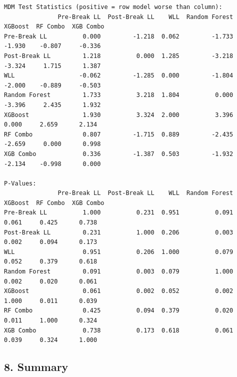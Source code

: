 \documentclass[
  letterpaper,
  DIV=11,
  numbers=noendperiod]{scrartcl}
\begin{document}
\begin{verbatim}
MDM Test Statistics (positive = row model worse than column):
               Pre-Break LL  Post-Break LL    WLL  Random Forest  XGBoost  RF Combo  XGB Combo
Pre-Break LL          0.000         -1.218  0.062         -1.733   -1.930    -0.807     -0.336
Post-Break LL         1.218          0.000  1.285         -3.218   -3.324     1.715      1.387
WLL                  -0.062         -1.285  0.000         -1.804   -2.000    -0.889     -0.503
Random Forest         1.733          3.218  1.804          0.000   -3.396     2.435      1.932
XGBoost               1.930          3.324  2.000          3.396    0.000     2.659      2.134
RF Combo              0.807         -1.715  0.889         -2.435   -2.659     0.000      0.998
XGB Combo             0.336         -1.387  0.503         -1.932   -2.134    -0.998      0.000

P-Values:
               Pre-Break LL  Post-Break LL    WLL  Random Forest  XGBoost  RF Combo  XGB Combo
Pre-Break LL          1.000          0.231  0.951          0.091    0.061     0.425      0.738
Post-Break LL         0.231          1.000  0.206          0.003    0.002     0.094      0.173
WLL                   0.951          0.206  1.000          0.079    0.052     0.379      0.618
Random Forest         0.091          0.003  0.079          1.000    0.002     0.020      0.061
XGBoost               0.061          0.002  0.052          0.002    1.000     0.011      0.039
RF Combo              0.425          0.094  0.379          0.020    0.011     1.000      0.324
XGB Combo             0.738          0.173  0.618          0.061    0.039     0.324      1.000
\end{verbatim}

\subsection{8. Summary}\label{summary}
\end{document}

